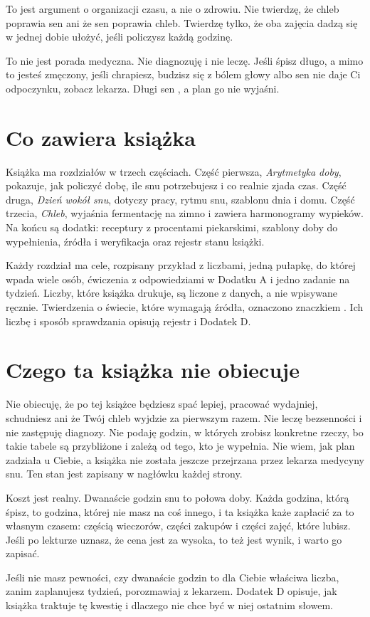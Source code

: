To jest argument o organizacji czasu, a nie o zdrowiu. Nie twierdzę, że chleb poprawia sen ani że sen poprawia chleb. Twierdzę tylko, że oba zajęcia dadzą się w jednej dobie ułożyć, jeśli policzysz każdą godzinę.

To nie jest porada medyczna. Nie diagnozuję i nie leczę. Jeśli śpisz długo, a mimo to jesteś zmęczony, jeśli chrapiesz, budzisz się z bólem głowy albo sen nie daje Ci odpoczynku, zobacz lekarza. Długi sen , a plan go nie wyjaśni.

\section*{Co zawiera książka}

Książka ma  rozdziałów w trzech częściach. Część pierwsza, \emph{Arytmetyka doby}, pokazuje, jak policzyć dobę, ile snu potrzebujesz i co realnie zjada czas. Część druga, \emph{Dzień wokół snu}, dotyczy pracy, rytmu snu, szablonu dnia i domu. Część trzecia, \emph{Chleb}, wyjaśnia fermentację na zimno i zawiera harmonogramy wypieków. Na końcu są dodatki: receptury z procentami piekarskimi, szablony doby do wypełnienia, źródła i weryfikacja oraz rejestr stanu książki.

Każdy rozdział ma cele, rozpisany przykład z liczbami, jedną pułapkę, do której wpada wiele osób, ćwiczenia z odpowiedziami w Dodatku A i jedno zadanie na tydzień. Liczby, które książka drukuje, są liczone z danych, a nie wpisywane ręcznie. Twierdzenia o świecie, które wymagają źródła, oznaczono znaczkiem \verify. Ich liczbę i sposób sprawdzania opisują rejestr i Dodatek D.

\section*{Czego ta książka nie obiecuje}

Nie obiecuję, że po tej książce będziesz spać lepiej, pracować wydajniej, schudniesz ani że Twój chleb wyjdzie za pierwszym razem. Nie leczę bezsenności i nie zastępuję diagnozy. Nie podaję godzin, w których zrobisz konkretne rzeczy, bo takie tabele są przybliżone i zależą od tego, kto je wypełnia. Nie wiem, jak plan zadziała u Ciebie, a książka nie została jeszcze przejrzana przez lekarza medycyny snu. Ten stan jest zapisany w nagłówku każdej strony.

Koszt jest realny. Dwanaście godzin snu to połowa doby. Każda godzina, którą śpisz, to godzina, której nie masz na coś innego, i ta książka każe zapłacić za to własnym czasem: częścią wieczorów, części zakupów i części zajęć, które lubisz. Jeśli po lekturze uznasz, że cena jest za wysoka, to też jest wynik, i warto go zapisać.

Jeśli nie masz pewności, czy dwanaście godzin to dla Ciebie właściwa liczba, zanim zaplanujesz tydzień, porozmawiaj z lekarzem. Dodatek D opisuje, jak książka traktuje tę kwestię i dlaczego nie chce być w niej ostatnim słowem.
